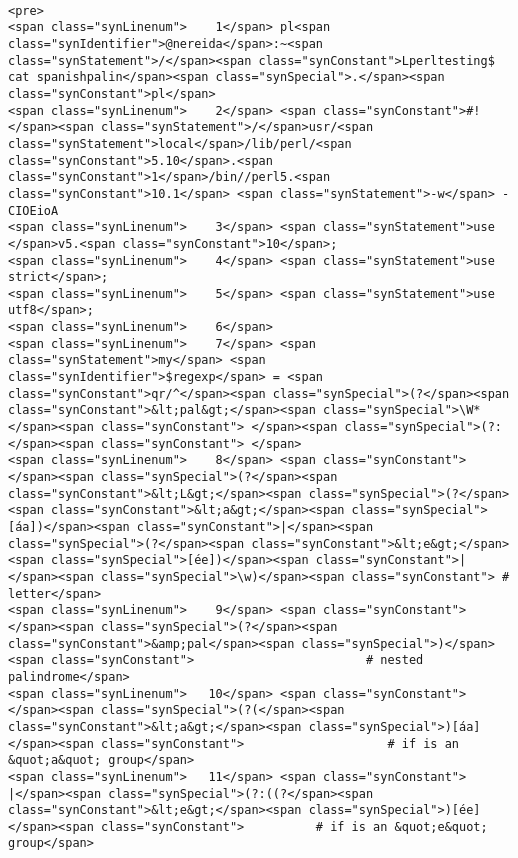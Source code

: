 \begin{verbatim}

<pre>
<span class="synLinenum">    1</span> pl<span class="synIdentifier">@nereida</span>:~<span class="synStatement">/</span><span class="synConstant">Lperltesting$ cat spanishpalin</span><span class="synSpecial">.</span><span class="synConstant">pl</span>
<span class="synLinenum">    2</span> <span class="synConstant">#!</span><span class="synStatement">/</span>usr/<span class="synStatement">local</span>/lib/perl/<span class="synConstant">5.10</span>.<span class="synConstant">1</span>/bin//perl5.<span class="synConstant">10.1</span> <span class="synStatement">-w</span> -CIOEioA
<span class="synLinenum">    3</span> <span class="synStatement">use </span>v5.<span class="synConstant">10</span>;
<span class="synLinenum">    4</span> <span class="synStatement">use strict</span>;
<span class="synLinenum">    5</span> <span class="synStatement">use utf8</span>;
<span class="synLinenum">    6</span> 
<span class="synLinenum">    7</span> <span class="synStatement">my</span> <span class="synIdentifier">$regexp</span> = <span class="synConstant">qr/^</span><span class="synSpecial">(?</span><span class="synConstant">&lt;pal&gt;</span><span class="synSpecial">\W*</span><span class="synConstant"> </span><span class="synSpecial">(?:</span><span class="synConstant"> </span>
<span class="synLinenum">    8</span> <span class="synConstant">                            </span><span class="synSpecial">(?</span><span class="synConstant">&lt;L&gt;</span><span class="synSpecial">(?</span><span class="synConstant">&lt;a&gt;</span><span class="synSpecial">[áa])</span><span class="synConstant">|</span><span class="synSpecial">(?</span><span class="synConstant">&lt;e&gt;</span><span class="synSpecial">[ée])</span><span class="synConstant">|</span><span class="synSpecial">\w)</span><span class="synConstant"> # letter</span>
<span class="synLinenum">    9</span> <span class="synConstant">                            </span><span class="synSpecial">(?</span><span class="synConstant">&amp;pal</span><span class="synSpecial">)</span><span class="synConstant">                        # nested palindrome</span>
<span class="synLinenum">   10</span> <span class="synConstant">                            </span><span class="synSpecial">(?(</span><span class="synConstant">&lt;a&gt;</span><span class="synSpecial">)[áa]</span><span class="synConstant">                    # if is an &quot;a&quot; group</span>
<span class="synLinenum">   11</span> <span class="synConstant">                                  |</span><span class="synSpecial">(?:((?</span><span class="synConstant">&lt;e&gt;</span><span class="synSpecial">)[ée]</span><span class="synConstant">          # if is an &quot;e&quot; group</span>

\end{verbatim}
